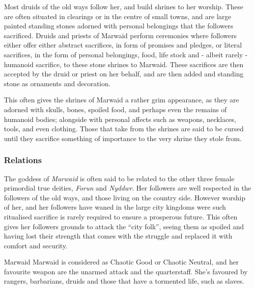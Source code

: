 Most druids of the old ways follow her, and build shrines to her worship.
These are often situated in clearings or in the centre of small towns, and are
large painted standing stones adorned with personal belongings that the
followers sacrificed. Druids and priests of Marwaid perform ceremonies where
followers either offer either abstract sacrifices, in form of promises and
pledges, or literal sacrifices, in the form of personal belongings, food, life
stock and - albeit rarely - humanoid sacrifice, to these stone shrines to
Marwaid. These sacrifices are then accepted by the druid or priest on her
behalf, and are then added and standing stone as ornaments and decoration.

This often gives the shrines of Marwaid a rather grim appearance, as they are
adorned with skulls, bones, spoiled food, and perhaps even the remains of
humanoid bodies; alongside with personal affects such as weapons, necklaces,
tools, and even clothing. Those that take from the shrines are said to be
cursed until they sacrifice something of importance to the very shrine they
stole from.

\subsubsection*{Relations}

The goddess of \emph{Marwaid} is often said to be related to the other three
female primordial true deities, \emph{Forun} and \emph{Nyddwr}. Her followers
are well respected in the followers of the old ways, and those living on the
country side. However worship of her, and her followers have waned in the
large city kingdoms were such ritualised sacrifice is rarely required to
ensure a prosperous future. This often gives her followers grounds to attack
the ``city folk'', seeing them as spoiled and having lost their strength that
comes with the struggle and replaced it with comfort and security.

\begin{35e}{Marwaid}
  Marwaid is considered as Chaotic Good or Chaotic Neutral, and her favourite
  weapon are the unarmed attack and the quarterstaff. She's favoured by rangers,
  barbarians, druids and those that have a tormented life, such as slaves.
\end{35e}
